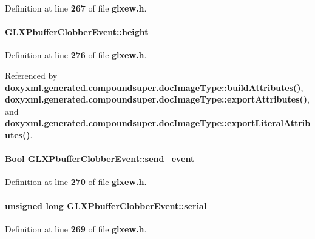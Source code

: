 Definition at line {\bf 267} of file {\bf glxew.\+h}.

\paragraph[{height}]{ G\+L\+X\+Pbuffer\+Clobber\+Event\+::height}\label{structGLXPbufferClobberEvent_aed4e539c896bdad15217bf92c28f8520}


Definition at line {\bf 276} of file {\bf glxew.\+h}.



Referenced by {\bf doxyxml.\+generated.\+compoundsuper.\+doc\+Image\+Type\+::build\+Attributes()}, {\bf doxyxml.\+generated.\+compoundsuper.\+doc\+Image\+Type\+::export\+Attributes()}, and {\bf doxyxml.\+generated.\+compoundsuper.\+doc\+Image\+Type\+::export\+Literal\+Attributes()}.

\paragraph[{send\+\_\+event}]{\setlength{\rightskip}{0pt plus 5cm}Bool G\+L\+X\+Pbuffer\+Clobber\+Event\+::send\+\_\+event}\label{structGLXPbufferClobberEvent_aa51969e67e4ad6095bda26ca64fe8ba6}


Definition at line {\bf 270} of file {\bf glxew.\+h}.

\paragraph[{serial}]{\setlength{\rightskip}{0pt plus 5cm}unsigned long G\+L\+X\+Pbuffer\+Clobber\+Event\+::serial}\label{structGLXPbufferClobberEvent_a6390b2875ae06a4cb827d2b4c321eda3}


Definition at line {\bf 269} of file {\bf glxew.\+h}.

